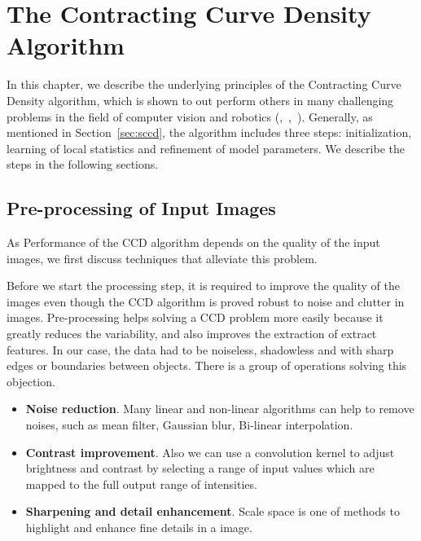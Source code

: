 \chapter{The Contracting Curve Density Algorithm}
\label{chapter:ccd}
In this chapter, we describe the underlying principles of the
Contracting Curve Density algorithm, which is shown to
out perform others in many challenging problems in the field of computer
vision and robotics (\cite{panin2006fully},~\cite{hanek2004contracting},~\cite{hahn2007tracking}). Generally, as mentioned in Section~\ref{sec:sccd},
the algorithm includes three steps: initialization, learning of
local statistics and refinement of model parameters. We describe the
steps in the following sections. 
\section{Pre-processing of Input Images}
\label{sec:init}
As Performance of the CCD algorithm depends on the quality of the
input images, we first discuss techniques that alleviate this problem.

Before we start the processing step, it is required to
improve the quality of the images even though the CCD
algorithm is proved robust to noise and clutter in
images. Pre-processing helps solving a CCD problem more easily
because it greatly reduces the variability, and also improves the
extraction of extract features. %
In our case, the data had to be noiseless, shadowless and with sharp edges or boundaries
between objects. There is a group of operations solving this objection.
\begin{itemize}
\item \textbf{Noise reduction}. Many linear and non-linear algorithms
  can help to remove noises, such as mean filter, Gaussian blur,
  Bi-linear interpolation.
\item \textbf{Contrast improvement}. Also we can use a convolution kernel to
  adjust brightness and contrast by selecting a range of input values
  which are mapped to the full output range of intensities.
\item \textbf{Sharpening and detail enhancement}. Scale space is one
  of methods to highlight and enhance fine details in a image.
\end{itemize}

